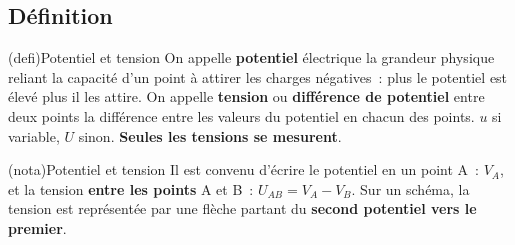 \documentclass[../../main/main.tex]{subfiles}
\begin{document}
\subsection{Définition}
\begin{tcb}[label=def:tension, sidebyside](defi){Potentiel et tension}
	On appelle \textbf{potentiel} électrique la grandeur physique reliant la
	capacité d'un point à attirer les charges négatives~: plus le potentiel
	est élevé plus il les attire.
	\bigbreak
	On appelle \textbf{tension} ou \textbf{différence de potentiel} entre deux
	points la différence entre les valeurs du potentiel en chacun des points.
	\tcblower
	$u$ si variable, $U$ sinon.
	\textbf{Seules les tensions se mesurent}.
\end{tcb}
\begin{tcb}[label=nota:tension, sidebyside, righthand ratio=.4](nota){Potentiel et tension}
	Il est convenu d'écrire le potentiel en un point A~: $V_A$, et la
	tension \textbf{entre les points} A et B~: $U_{AB} = V_A - V_B$. Sur un
	schéma, la tension est représentée par une flèche partant du
	\textbf{second potentiel vers le premier}.
	\tcblower
	\begin{center}
	\end{center}
\end{tcb}
\end{document}
